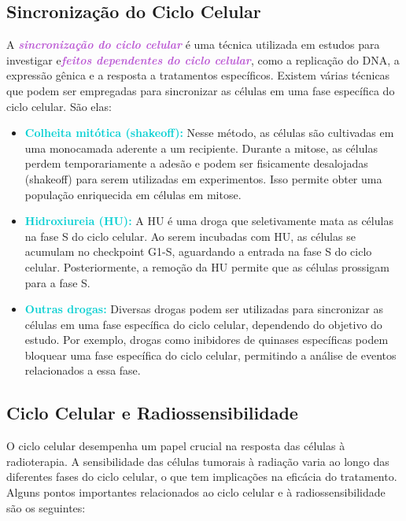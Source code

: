 \documentclass[11pt,a4paper]{article}
\newcounter{exemplo}
\begin{document}
\subsection*{Sincronização do Ciclo Celular}

	A \textcolor{MediumOrchid}{\textbf{\textit{sincronização do ciclo celular}}} é uma técnica utilizada em estudos para investigar e\textcolor{MediumOrchid}{\textbf{\textit{feitos dependentes do ciclo celular}}}, como a replicação do DNA, a expressão gênica e a resposta a tratamentos específicos. Existem várias técnicas que podem ser empregadas para sincronizar as células em uma fase específica do ciclo celular. São elas:

	\begin{itemize}
	\item \textcolor{DarkTurquoise}{\textbf{Colheita mitótica (shakeoff):}} Nesse método, as células são cultivadas em uma monocamada aderente a um recipiente. Durante a mitose, as células perdem temporariamente a adesão e podem ser fisicamente desalojadas (shakeoff) para serem utilizadas em experimentos. Isso permite obter uma população enriquecida em células em mitose.

	\item \textcolor{DarkTurquoise}{\textbf{Hidroxiureia (HU):}} A HU é uma droga que seletivamente mata as células na fase S do ciclo celular. Ao serem incubadas com HU, as células se acumulam no checkpoint G1-S, aguardando a entrada na fase S do ciclo celular. Posteriormente, a remoção da HU permite que as células prossigam para a fase S.

	\item \textcolor{DarkTurquoise}{\textbf{Outras drogas:}} Diversas drogas podem ser utilizadas para sincronizar as células em uma fase específica do ciclo celular, dependendo do objetivo do estudo. Por exemplo, drogas como inibidores de quinases específicas podem bloquear uma fase específica do ciclo celular, permitindo a análise de eventos relacionados a essa fase.
	\end{itemize}

\subsection*{Ciclo Celular e Radiossensibilidade}

	O ciclo celular desempenha um papel crucial na resposta das células à radioterapia. A sensibilidade das células tumorais à radiação varia ao longo das diferentes fases do ciclo celular, o que tem implicações na eficácia do tratamento. Alguns pontos importantes relacionados ao ciclo celular e à radiossensibilidade são os seguintes:
\end{document}
